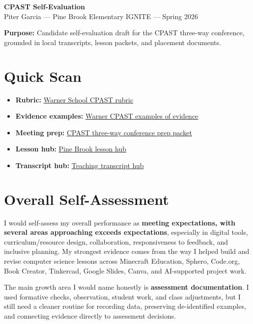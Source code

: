 \documentclass[10pt]{article}
\newcommand{\doclink}[2]{\href{run:#1}{#2}}
\begin{document}
\begin{center}
{\LARGE\bfseries CPAST Self-Evaluation}\\[0.25em]
{\large Piter Garcia --- Pine Brook Elementary IGNITE --- Spring 2026}\\[0.4em]
\colorbox{softblue}{\parbox{0.92\linewidth}{\centering
\textbf{Purpose:} Candidate self-evaluation draft for the CPAST three-way conference, grounded in local transcripts, lesson packets, and placement documents.
}}
\end{center}

\section{Quick Scan}

\begin{itemize}[leftmargin=*]
  \item \textbf{Rubric:} \doclink{../warner-school-cpast-rubric.docx}{Warner School CPAST rubric}
  \item \textbf{Evidence examples:} \doclink{../warner-cpast-examples-of-evidence.docx}{Warner CPAST examples of evidence}
  \item \textbf{Meeting prep:} \doclink{./cpast-three-way-conference-prep.pdf}{CPAST three-way conference prep packet}
  \item \textbf{Lesson hub:} \doclink{../../pine-brook-elementary/lessons/lessons-notes.md}{Pine Brook lesson hub}
  \item \textbf{Transcript hub:} \doclink{../../transcripts/transcripts-notes.md}{Teaching transcript hub}
\end{itemize}

\section{Overall Self-Assessment}

I would self-assess my overall performance as \textbf{meeting expectations, with several areas approaching exceeds expectations}, especially in digital tools, curriculum/resource design, collaboration, responsiveness to feedback, and inclusive planning. My strongest evidence comes from the way I helped build and revise computer science lessons across Minecraft Education, Sphero, Code.org, Book Creator, Tinkercad, Google Slides, Canva, and AI-supported project work.

The main growth area I would name honestly is \textbf{assessment documentation}. I used formative checks, observation, student work, and class adjustments, but I still need a cleaner routine for recording data, preserving de-identified examples, and connecting evidence directly to assessment decisions.
\end{document}

